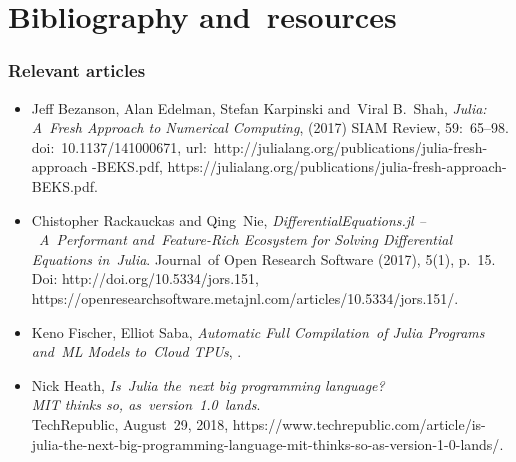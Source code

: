 \documentclass[10pt,t]{beamer}
\begin{document}
\section{Bibliography and~resources}



\begin{frame}
  \frametitle{Relevant articles}


  \begin{itemize}

  \item Jeff Bezanson, Alan Edelman, Stefan Karpinski and~Viral
    B.~Shah, \textit{Julia: A~Fresh Approach to Numerical Computing},
    (2017) SIAM Review, 59:~65--98. doi:~10.1137/141000671,
    url:~http://julialang.org/publications/julia-fresh-approach
    -BEKS.pdf,
    {https://julialang.org/publications/julia-fresh-approach-BEKS.pdf}.

  \item Chistopher Rackauckas and Qing~Nie,
    \textit{DifferentialEquations.jl --~A~Performant and~Feature-Rich
      Ecosystem for Solving Differential Equations in~Julia}.
    Journal~of Open Research Software (2017), 5(1), p.~15. Doi:
    http://doi.org/10.5334/jors.151,
    {https://openresearchsoftware.metajnl.com/articles/10.5334/jors.151/}.

  \item Keno Fischer, Elliot Saba, \textit{Automatic Full Compilation~of
      Julia Programs and~ML Models to~Cloud TPUs},
    .

  \item Nick Heath, \textit{Is~Julia the~next big programming
      language? \\
      MIT thinks so, as~version~1.0~lands}. \\
    TechRepublic, August~29, 2018,
    {https://www.techrepublic.com/article/is-julia-the-next-big-programming-language-mit-thinks-so-as-version-1-0-lands/}.

  \end{itemize}

\end{frame}
\end{document}
